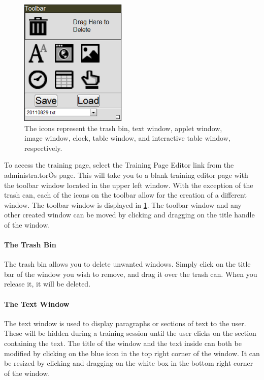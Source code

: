 \documentclass[article]{ij4uq}              %
\begin{document}
\begin{figure}[h!]
 \centering
 \includegraphics[width=2.0in]{figures/toolbar.eps}
 \caption{The icons represent the trash bin, text window, applet window, image window, clock, table window, and interactive table window, respectively.}
 \label{fig:tool}
\end{figure}
\FloatBarrier

To access the training page, select the Training Page Editor link from the administra.torÕs page. This will take you to a blank training editor page with the toolbar window located in the upper left window. With the exception of the trash can, each of the icons on the toolbar allow for the creation of a different window. The toolbar window is displayed in \ref{fig:tool}. The toolbar window and any other created window can be moved by clicking and dragging on the title handle of the window.

\paragraph{The Trash Bin}

The trash bin allows you to delete unwanted windows. Simply click on the title bar of the window you wish to remove, and drag it over the trash can. When you release it, it will be deleted.

\paragraph{The Text Window}
The text window is used to display paragraphs or sections of text to the user. These will be hidden during a training session until the user clicks on the section containing the text. The title of the window and the text inside can both be modified by clicking on the blue icon in the top right corner of the window. It can be resized by clicking and dragging on the white box in the bottom right corner of the window.
\end{document}
